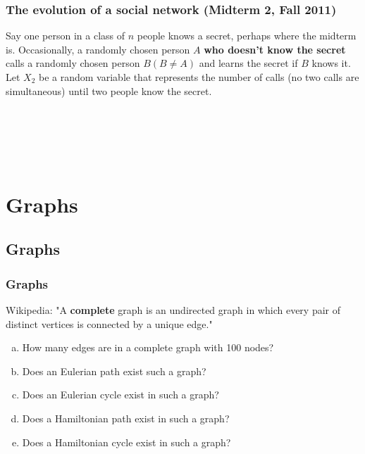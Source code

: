 \documentclass[9pt]{beamer}
\begin{document}
\begin{frame}[fragile]
  \frametitle{The evolution of a social network (Midterm 2, Fall 2011)}
Say one person in a class of $n$ people knows a secret, perhaps where the midterm is. Occasionally, a randomly chosen person $A$ \textbf{who doesn't know the secret} calls a randomly chosen person $B (B \neq A)$ and learns the secret if $B$ knows it. Let $X_2$ be a random variable that represents the number of calls (no two calls are simultaneous) until two people know the secret. \\ \vspace{5.00mm} 
\begin{enumerate} [(a)]
\\
\\
\\
\\
\end{enumerate}
\end{frame}



\section{Graphs}
\subsection{Graphs}

\begin{frame}[fragile]
  \frametitle{Graphs}
Wikipedia: "A \textbf{complete} graph is an undirected graph in which every pair of distinct vertices is connected by a unique edge."
\begin{enumerate}[(a)]
\item How many edges are in a complete graph with 100 nodes? 
\item Does an Eulerian path exist such a graph? 
\item Does an Eulerian cycle exist in such a graph? 
\item Does a Hamiltonian path exist in such a graph? 
\item Does a Hamiltonian cycle exist in such a graph? 
\end{enumerate}
\end{frame}
\end{document}
